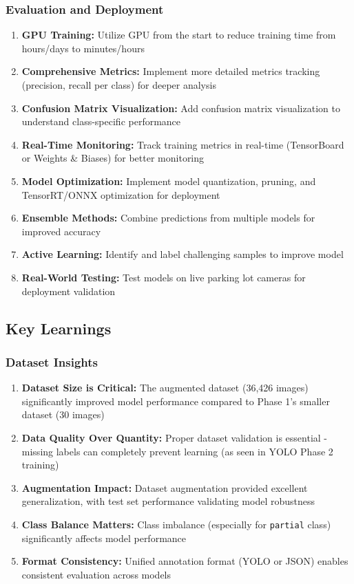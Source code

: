 \documentclass[12pt,a4paper]{article}
\begin{document}
\subsubsection{Evaluation and Deployment}

\begin{enumerate}
    \item \textbf{GPU Training:} Utilize GPU from the start to reduce training time from hours/days to minutes/hours
    \item \textbf{Comprehensive Metrics:} Implement more detailed metrics tracking (precision, recall per class) for deeper analysis
    \item \textbf{Confusion Matrix Visualization:} Add confusion matrix visualization to understand class-specific performance
    \item \textbf{Real-Time Monitoring:} Track training metrics in real-time (TensorBoard or Weights \& Biases) for better monitoring
    \item \textbf{Model Optimization:} Implement model quantization, pruning, and TensorRT/ONNX optimization for deployment
    \item \textbf{Ensemble Methods:} Combine predictions from multiple models for improved accuracy
    \item \textbf{Active Learning:} Identify and label challenging samples to improve model
    \item \textbf{Real-World Testing:} Test models on live parking lot cameras for deployment validation
\end{enumerate}

\subsection{Key Learnings}

\subsubsection{Dataset Insights}

\begin{enumerate}
    \item \textbf{Dataset Size is Critical:} The augmented dataset (36,426 images) significantly improved model performance compared to Phase 1's smaller dataset (30 images)
    \item \textbf{Data Quality Over Quantity:} Proper dataset validation is essential - missing labels can completely prevent learning (as seen in YOLO Phase 2 training)
    \item \textbf{Augmentation Impact:} Dataset augmentation provided excellent generalization, with test set performance validating model robustness
    \item \textbf{Class Balance Matters:} Class imbalance (especially for \texttt{partial} class) significantly affects model performance
    \item \textbf{Format Consistency:} Unified annotation format (YOLO or JSON) enables consistent evaluation across models
\end{enumerate}
\end{document}
